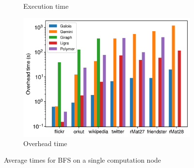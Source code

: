 \begin{figure}[ht]
\begin{subfigure}{0.32\textwidth}
		\caption{Execution time}
		\label{fig:singleNodeBFS_exec}
	\end{subfigure}
	\hfil
	\begin{subfigure}{0.32\textwidth}
		\includegraphics[width=\linewidth]{../../plots/singleNodeBFS_overheadTime.png}
		\caption{Overhead time}
		\label{fig:singleNodeBFS_overheadNormalized}
	\end{subfigure}
	\caption{Average times for BFS on a single computation node}
\end{figure}
